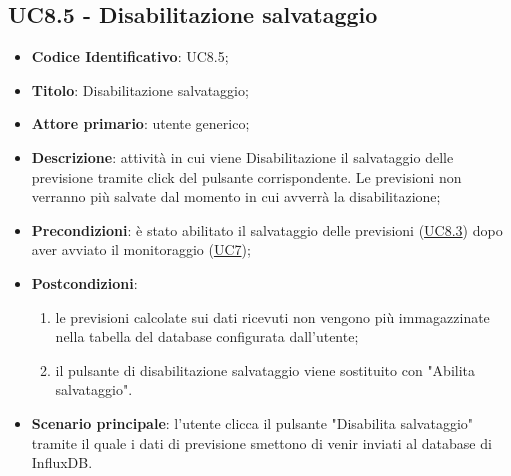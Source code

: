 	\subsection{UC8.5 - Disabilitazione salvataggio}
		\begin{itemize}
			\item\textbf{Codice Identificativo}: UC8.5;
			\item\textbf{Titolo}: Disabilitazione salvataggio;
			\item\textbf{Attore primario}: utente generico;
			\item\textbf{Descrizione}: attività in cui viene Disabilitazione il salvataggio delle previsione tramite click del pulsante corrispondente. Le previsioni non verranno più salvate dal momento in cui avverrà la disabilitazione;
			\item\textbf{Precondizioni}: è stato abilitato il salvataggio delle previsioni (\hyperref[par:UC8.3]{UC8.3}) dopo aver avviato il monitoraggio (\hyperref[par:UC7]{UC7});
			\item\textbf{Postcondizioni}: 
			\begin{enumerate}
			\item le previsioni calcolate sui dati ricevuti non vengono più immagazzinate nella tabella del database configurata dall'utente;
			\item il pulsante di disabilitazione salvataggio viene sostituito con "Abilita salvataggio".
			\end{enumerate}
			\item\textbf{Scenario principale}: l'utente clicca il pulsante "Disabilita salvataggio" tramite il quale i dati di previsione smettono di venir inviati al database di InfluxDB.		
		\end{itemize}	

\label{par:UC8.6}

